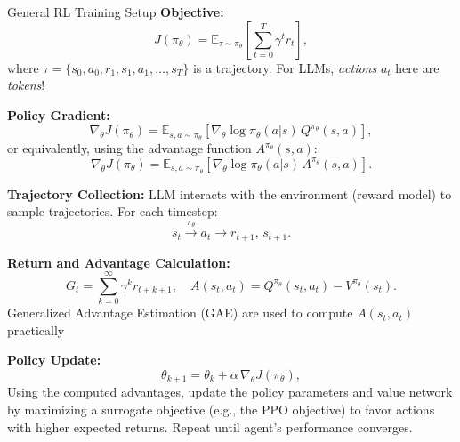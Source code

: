 \documentclass[8pt]{beamer}
\begin{document}
\begin{frame}{General RL Training Setup}
\small
    \textbf{Objective:}
    \[
    J(\pi_\theta) = \mathbb{E}_{\tau \sim \pi_\theta}\left[\sum_{t=0}^{T} \gamma^t r_t\right],
    \]
    where \(\tau = \{s_0, a_0, r_1, s_1, a_1, \dots, s_T\}\) is a trajectory. For LLMs, \textit{actions} $a_t$ here are \textit{tokens}!
    
    \vspace{0.8em}
    
    \textbf{Policy Gradient:}
    \[
    \nabla_\theta J(\pi_\theta) = \mathbb{E}_{s,a \sim \pi_\theta}\left[\nabla_\theta \log \pi_\theta(a|s) \, Q^{\pi_\theta}(s,a)\right],
    \]
    or equivalently, using the advantage function \(A^{\pi_\theta}(s,a)\):
    \[
    \nabla_\theta J(\pi_\theta) = \mathbb{E}_{s,a \sim \pi_\theta}\left[\nabla_\theta \log \pi_\theta(a|s) \, A^{\pi_\theta}(s,a)\right].
    \]
    
    \vspace{0.8em}
    
    \textbf{Trajectory Collection:}  
    LLM interacts with the environment (reward model) to sample trajectories. For each timestep:
    \[
    s_t \xrightarrow{\pi_\theta} a_t \rightarrow r_{t+1},\, s_{t+1}.
    \]
    
    \vspace{0.8em}
    
    \textbf{Return and Advantage Calculation:}
    \[
    G_t = \sum_{k=0}^{\infty} \gamma^k r_{t+k+1}, \quad
    A(s_t,a_t) = Q^{\pi_\theta}(s_t,a_t) - V^{\pi_\theta}(s_t).
    \]
    Generalized Advantage Estimation (GAE) are used to compute \(A(s_t,a_t)\) practically
    
    \vspace{0.8em}
    
    \textbf{Policy Update:}
    \[
    \theta_{k+1} = \theta_k + \alpha\, \nabla_\theta J(\pi_\theta),
    \]
    Using the computed advantages, update the policy parameters and value network by maximizing a surrogate objective (e.g., the PPO objective) to favor actions with higher expected returns. Repeat until agent’s performance converges.
\end{frame}
\end{document}
